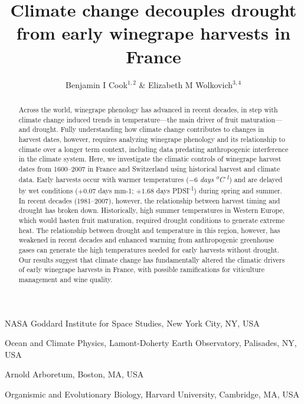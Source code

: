 \documentclass[final]{nature}
\title{Climate change decouples drought from early winegrape harvests in France}
\author{Benjamin I Cook$^{1,2}$ \& Elizabeth M Wolkovich$^{3,4}$} %
\begin{document}
\maketitle

\begin{affiliations}
 \item NASA Goddard Institute for Space Studies, New York City, NY, USA
 \item Ocean and Climate Physics, Lamont-Doherty Earth Observatory, Palisades, NY, USA
 \item Arnold Arboretum, Boston, MA, USA
 \item Organismic and Evolutionary Biology, Harvard University, Cambridge, MA, USA
\end{affiliations}

\begin{abstract}
Across the world, winegrape phenology has advanced in recent decades\cite{Duchene:2005bd,Seguin2005,webb2011}, in step with climate change induced trends in temperature---the main driver of fruit maturation---and drought. Fully understanding how climate change contributes to changes in harvest dates, however, requires analyzing winegrape phenology and its relationship to climate over a longer term context, including data predating anthropogenic interference in the climate system. Here, we investigate the climatic controls of winegrape harvest dates from 1600--2007 in France and Switzerland using historical harvest\cite{Daux2012} and climate data\cite{Luterbacher2004,CookOWDA2015,Pauling2006}. Early harvests occur with warmer temperatures ($-6$ \emph{days \textsuperscript{o}C\textsuperscript{-1}}) and are delayed by wet conditions ($+0.07$ days mm{-1}; $+1.68$ days PDSI\textsuperscript{-1}) during spring and summer. In recent decades (1981--2007), however, the relationship between harvest timing and drought has broken down. Historically, high summer temperatures in Western Europe, which would hasten fruit maturation, required drought conditions to generate extreme heat. The relationship between drought and temperature in this region, however, has weakened in recent decades and enhanced warming from anthropogenic greenhouse gases can generate the high temperatures needed for early harvests without drought. Our results suggest that climate change has fundamentally altered the climatic drivers of early winegrape harvests in France, with possible ramifications for viticulture management and wine quality.
\end{abstract}
\end{document}
